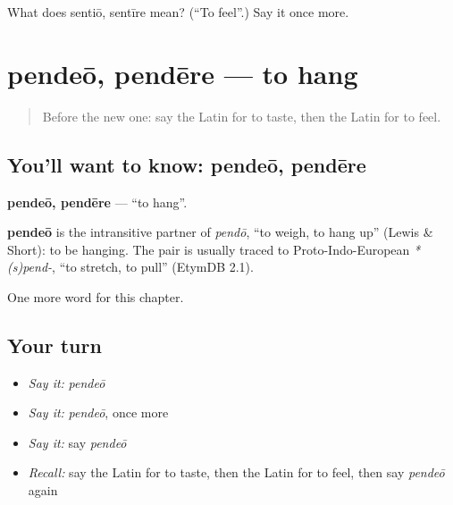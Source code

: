 \begin{tcolorbox}[breakable,colback=teal!4,colframe=teal!35!black,title={Before you move on}]
What does sentiō, sentīre mean? (\textquotedblleft{}To feel\textquotedblright{}.) Say it once more.
\end{tcolorbox}
\section[pendeō, pendēre]{pendeō, pendēre — to hang}

\label{lesson:LA-C159-pendeo}



\begin{quote}
Before the new one: say the Latin for to taste, then the Latin for to feel.
\end{quote}

\subsection*{You'll want to know: pendeō, pendēre}
\textbf{pendeō, pendēre} — \textquotedblleft{}to hang\textquotedblright{}.

\begin{cousinweb}
\textbf{pendeō} is the intransitive partner of \emph{pendō}, \textquotedblleft{}to weigh, to hang up\textquotedblright{} (Lewis \& Short): to be hanging. The pair is usually traced to Proto-Indo-European \emph{*(s)pend-}, \textquotedblleft{}to stretch, to pull\textquotedblright{} (EtymDB 2.1).
\end{cousinweb}

\begin{grammarlens}[title={What you've built}]
One more word for this chapter.
\end{grammarlens}

\subsection*{Your turn}
\begin{itemize}
\raggedright
  \item \emph{Say it:} \emph{pendeō}
  \item \emph{Say it:} \emph{pendeō}, once more
  \item \emph{Say it:} say \emph{pendeō}
  \item \emph{Recall:} say the Latin for to taste, then the Latin for to feel, then say \emph{pendeō} again
\end{itemize}

